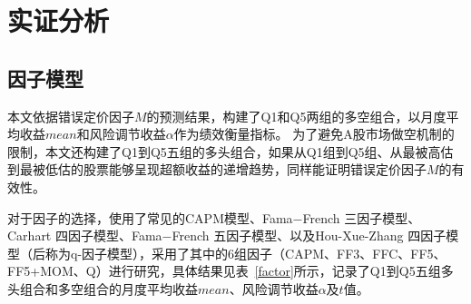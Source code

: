 
\chapter{实证分析}

\section{因子模型}\label{sfactor}
本文依据错误定价因子$M$的预测结果，构建了Q1和Q5两组的多空组合，以月度平均收益$mean$和风险调节收益$\alpha$作为绩效衡量指标。 为了避免A股市场做空机制的限制，本文还构建了Q1到Q5五组的多头组合，如果从Q1组到Q5组、从最被高估到最被低估的股票能够呈现超额收益的递增趋势，同样能证明错误定价因子$M$的有效性。

对于因子的选择，使用了常见的CAPM模型、Fama−French 三因子模型、 Carhart 四因子模型、Fama−French 五因子模型、以及Hou-Xue-Zhang 四因子模型（后称为q-因子模型），采用了其中的6组因子（CAPM、FF3、FFC、FF5、FF5+MOM、Q）进行研究，具体结果见表~\ref{factor}所示，记录了Q1到Q5五组多头组合和多空组合的月度平均收益$mean$、风险调节收益$\alpha$及$t$值。


